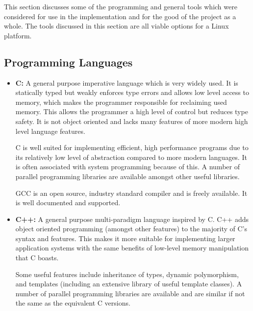 This section discusses some of the programming and general tools which were considered
for use in the implementation and for the good of the project as a whole.
The tools discussed in this section are all viable options for a Linux platform.

\subsection*{Programming Languages}

\begin{itemize}
\item \textbf{C:} 
            A general purpose imperative language which is very widely used.
            It is statically typed but weakly enforces type errors and allows low level access to memory, which 
            makes the programmer responsible for reclaiming used memory.
            This allows the programmer a high level of control but reduces type safety.
            It is not object oriented and lacks many features of more modern high level
            language features.
            
            C is well suited for implementing efficient, high performance programs due to
            its relatively low level of abstraction compared to more modern languages.
            It is often associated with system programming because of this.
            A number of parallel programming libraries are available amongst other useful 
            libraries.
            
            GCC is an open source, industry standard compiler and is freely available. 
            It is well documented and supported.

\item \textbf{C++:}
            A general purpose multi-paradigm language inspired by C.
            C++ adds object oriented programming (amongst other features) to the majority 
            of C's syntax and features. 
            This makes it more suitable for implementing larger application systems 
            with the same benefits of low-level memory manipulation that C boasts.
            
            Some useful features include inheritance of types, dynamic polymorphism, 
            and templates (including an extensive library of useful template classes).
            A number of parallel programming libraries are available and are similar 
            if not the same as the equivalent C versions.
            

\end{itemize}
